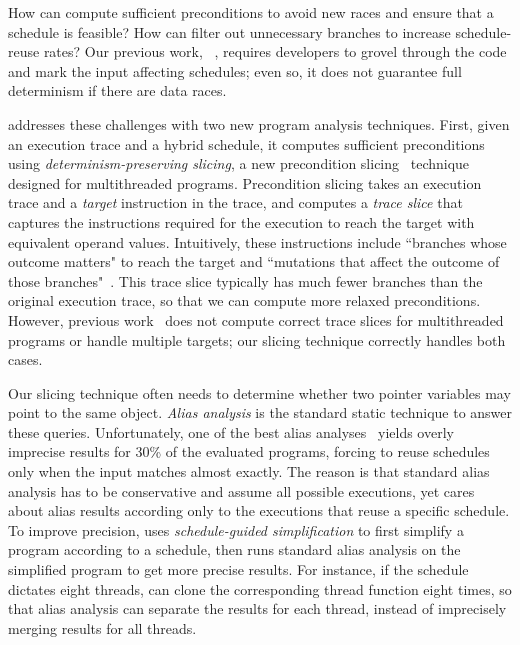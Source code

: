 How can \peregrine compute sufficient preconditions to avoid new races and
ensure that a schedule is feasible?  How can \peregrine filter out unnecessary
branches to increase schedule-reuse rates?  Our previous
work, \tern~\cite{cui:tern:osdi10}, requires developers to grovel through the
code and mark the input affecting schedules; even so, it does not
guarantee full determinism if there are data races.

\peregrine addresses these challenges with two new
program analysis techniques.  First, given an execution trace and a hybrid
schedule, it computes sufficient preconditions using
\emph{determinism-preserving slicing}, a new precondition
slicing~\cite{castro:bouncer} technique designed for multithreaded
programs.  Precondition slicing takes an execution trace and a
\emph{target} instruction in the trace, and computes 
a \emph{trace slice} that captures the instructions required for the
execution to reach the target with equivalent operand
values.  Intuitively, these instructions include ``branches whose
  outcome matters" to reach the target and ``mutations that affect the
  outcome of those branches"~\cite{castro:bouncer}.  This trace slice
typically has much fewer branches than the original execution trace,
so that we can compute more relaxed preconditions.  However, previous
work~\cite{castro:bouncer} does not compute correct trace slices for
multithreaded programs or handle multiple targets; our slicing
technique correctly handles both cases.

Our slicing technique often needs to determine whether two pointer
variables may point to the same object.  \emph{Alias
  analysis} is the standard static technique to answer these queries.
Unfortunately, one of the best alias analyses~\cite{bddalias:pldi04} yields
overly
imprecise results for 30\% of the evaluated programs, forcing \peregrine to
reuse
schedules only when the input matches almost exactly.  The reason is that
standard
alias analysis has to be conservative and assume all possible executions,
yet \peregrine cares about alias results
according only to the executions that reuse a specific schedule.  To
improve precision, \peregrine uses \emph{schedule-guided simplification} to
first simplify a program according to a schedule, then runs standard alias
analysis on the simplified program to get more precise results.  For
instance, if the schedule dictates eight threads, \peregrine can clone
the corresponding thread function eight times, so that alias analysis can
separate the results for each thread, instead of imprecisely merging
results for all threads.

